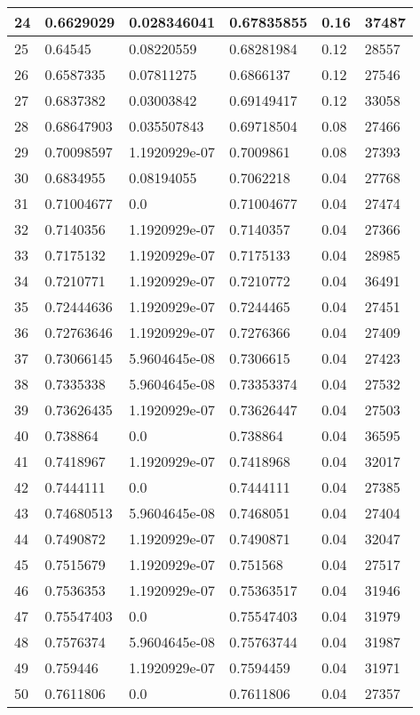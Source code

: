 \begin{longtable}{|l|l|l|l|l|l|}
24 & 0.6629029 & 0.028346041 & 0.67835855 & 0.16 & 37487 \\ \hline 
25 & 0.64545 & 0.08220559 & 0.68281984 & 0.12 & 28557 \\ \hline 
26 & 0.6587335 & 0.07811275 & 0.6866137 & 0.12 & 27546 \\ \hline 
27 & 0.6837382 & 0.03003842 & 0.69149417 & 0.12 & 33058 \\ \hline 
28 & 0.68647903 & 0.035507843 & 0.69718504 & 0.08 & 27466 \\ \hline 
29 & 0.70098597 & 1.1920929e-07 & 0.7009861 & 0.08 & 27393 \\ \hline 
30 & 0.6834955 & 0.08194055 & 0.7062218 & 0.04 & 27768 \\ \hline 
31 & 0.71004677 & 0.0 & 0.71004677 & 0.04 & 27474 \\ \hline 
32 & 0.7140356 & 1.1920929e-07 & 0.7140357 & 0.04 & 27366 \\ \hline 
33 & 0.7175132 & 1.1920929e-07 & 0.7175133 & 0.04 & 28985 \\ \hline 
34 & 0.7210771 & 1.1920929e-07 & 0.7210772 & 0.04 & 36491 \\ \hline 
35 & 0.72444636 & 1.1920929e-07 & 0.7244465 & 0.04 & 27451 \\ \hline 
36 & 0.72763646 & 1.1920929e-07 & 0.7276366 & 0.04 & 27409 \\ \hline 
37 & 0.73066145 & 5.9604645e-08 & 0.7306615 & 0.04 & 27423 \\ \hline 
38 & 0.7335338 & 5.9604645e-08 & 0.73353374 & 0.04 & 27532 \\ \hline 
39 & 0.73626435 & 1.1920929e-07 & 0.73626447 & 0.04 & 27503 \\ \hline 
40 & 0.738864 & 0.0 & 0.738864 & 0.04 & 36595 \\ \hline 
41 & 0.7418967 & 1.1920929e-07 & 0.7418968 & 0.04 & 32017 \\ \hline 
42 & 0.7444111 & 0.0 & 0.7444111 & 0.04 & 27385 \\ \hline 
43 & 0.74680513 & 5.9604645e-08 & 0.7468051 & 0.04 & 27404 \\ \hline 
44 & 0.7490872 & 1.1920929e-07 & 0.7490871 & 0.04 & 32047 \\ \hline 
45 & 0.7515679 & 1.1920929e-07 & 0.751568 & 0.04 & 27517 \\ \hline 
46 & 0.7536353 & 1.1920929e-07 & 0.75363517 & 0.04 & 31946 \\ \hline 
47 & 0.75547403 & 0.0 & 0.75547403 & 0.04 & 31979 \\ \hline 
48 & 0.7576374 & 5.9604645e-08 & 0.75763744 & 0.04 & 31987 \\ \hline 
49 & 0.759446 & 1.1920929e-07 & 0.7594459 & 0.04 & 31971 \\ \hline 
50 & 0.7611806 & 0.0 & 0.7611806 & 0.04 & 27357 \\ \hline 
\end{longtable}